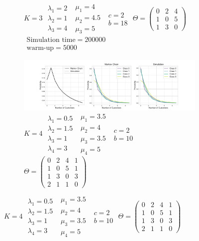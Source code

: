 \documentclass{article}
\begin{document}
\begin{figure}[h!]
\begin{center}
\begin{subfigure}[b]{\textwidth}
    \caption{
        $K = 3$
        $\begin{array}{c}\lambda_1 = 2\\\lambda_2 = 1\\\lambda_3 = 4\end{array}$
        $\begin{array}{c}\mu_1 = 4\\\mu_2 = 4.5\\\mu_3 = 5\end{array}$
        $\begin{array}{c}c=2\\b=18\end{array}$
        $\Theta = \begin{pmatrix}0 & 2 & 4\\1 & 0 & 5\\1 & 3 & 0\end{pmatrix}$
        $\begin{array}{c}\text{Simulation time} = 200000\\\text{warm-up} = 5000\end{array}$
    }
  \end{subfigure}
  \vspace{3mm}
  \begin{subfigure}[b]{\textwidth}
    \includegraphics[width=\textwidth]{img/appendix_4class.pdf}
    \caption{
        $K = 4$
        $\begin{array}{c}\lambda_1 = 0.5\\\lambda_2 = 1.5\\\lambda_3 = 1\\\lambda_4 = 3\end{array}$
        $\begin{array}{c}\mu_1 = 3.5\\\mu_2 = 4\\\mu_3 = 3.5\\\mu_4 = 5\end{array}$
        $\begin{array}{c}c=2\\b=10\end{array}$
        $\Theta = \begin{pmatrix}0 & 2 & 4 & 1\\1 & 0 & 5 & 1\\1 & 3 & 0 & 3\\2 & 1 & 1 & 0\end{pmatrix}$
}
\end{subfigure}
\end{center}
\end{figure}
\end{document}
